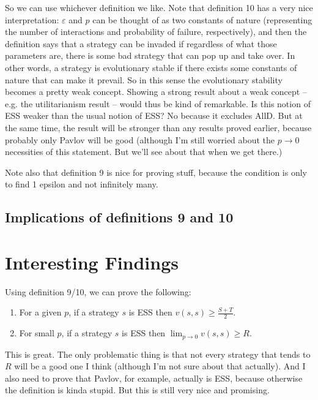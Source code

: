 \documentclass[11pt]{amsart}
\theoremstyle{definition}
\theoremstyle{remark}
\begin{document}
So we can use whichever definition we like. Note that definition 10 has a very nice interpretation: $\varepsilon$ and $p$ can be thought of as two constants of nature (representing the number of interactions and probability of failure, respectively), and then the definition says that a strategy can be invaded if regardless of what those parameters are, there is some bad strategy that can pop up and take over. In other words, a strategy is evolutionary stable if there exists some constants of nature that can make it prevail. So in this sense the evolutionary stability becomes a pretty weak concept. Showing a strong result about a weak concept -- e.g. the utilitarianism result -- would thus be kind of remarkable. Is this notion of ESS weaker than the usual notion of ESS? No because it excludes AllD. But at the same time, the result will be stronger than any results proved earlier, because probably only Pavlov will be good (although I'm still worried about the $p \to 0$ necessities of this statement. But we'll see about that when we get there.)

Note also that definition 9 is nice for proving stuff, because the condition is only to find 1 epsilon and not infinitely many.

\subsection*{Implications of definitions 9 and 10}



\section*{Interesting Findings}

Using definition 9/10, we can prove the following:

\begin{enumerate}
  \item For a given $p$, if a strategy $s$ is ESS then $v(s,s) \geq \frac{S + T}{2}$.
  \item For small $p$, if a strategy $s$ is ESS then $\lim_{p \to 0} v(s,s) \geq R$.
\end{enumerate}

This is great. The only problematic thing is that not every strategy that tends to $R$ will be a good one I think (although I'm not sure about that actually). And I also need to prove that Pavlov, for example, actually is ESS, because otherwise the definition is kinda stupid. But this is still very nice and promising.
\end{document}
